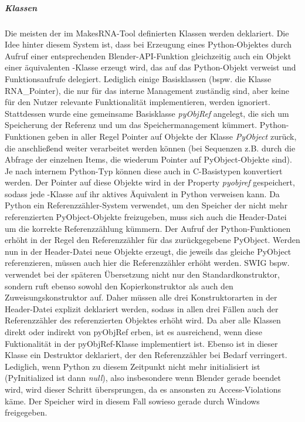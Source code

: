 \subparagraph{Klassen}

Die meisten der im MakesRNA-Tool definierten Klassen werden deklariert. Die Idee hinter diesem System ist, dass bei Erzeugung eines Python-Objektes durch Aufruf einer entsprechenden Blender-API-Funktion gleichzeitig auch ein Objekt einer äquivalenten \CC-Klasse erzeugt wird, das auf das Python-Objekt verweist und Funktionsaufrufe delegiert. Lediglich einige Basisklassen (bspw. die Klasse RNA\_Pointer), die nur für das interne Management zuständig sind, aber keine für den Nutzer relevante Funktionalität implementieren, werden ignoriert. Stattdessen wurde eine gemeinsame Basisklasse \emph{pyObjRef} angelegt, die sich um Speicherung der Referenz und um das Speichermanagement kümmert. Python-Funktionen geben in aller Regel Pointer auf Objekte der Klasse \emph{PyObject} zurück, die anschließend weiter verarbeitet werden können (bei Sequenzen z.B. durch die Abfrage der einzelnen Items, die wiederum Pointer auf PyObject-Objekte sind). Je nach internem Python-Typ können diese auch in C-Basistypen konvertiert werden. Der Pointer auf diese Objekte wird in der Property \emph{pyobjref} gespeichert, sodass jede \CC-Klasse auf ihr aktives Äquivalent in Python verweisen kann. Da Python ein Referenzzähler-System verwendet, um den Speicher der nicht mehr referenzierten PyObject-Objekte freizugeben, muss sich auch die Header-Datei um die korrekte Referenzzählung kümmern. Der Aufruf der Python-Funktionen erhöht in der Regel den Referenzzähler für das zurückgegebene PyObject. Werden nun in der Header-Datei neue Objekte erzeugt, die jeweils das gleiche PyObject referenzieren, müssen auch hier die Referenzzähler erhöht werden. SWIG bspw. verwendet bei der späteren Übersetzung nicht nur den Standardkonstruktor, sondern ruft ebenso sowohl den Kopierkonstruktor als auch den Zuweisungskonstruktor auf. Daher müssen alle drei Konstruktorarten in der Header-Datei explizit deklariert werden, sodass in allen drei Fällen auch der Referenzzähler des referenzierten Objektes erhöht wird. Da aber alle Klassen direkt oder indirekt von pyObjRef erben, ist es ausreichend, wenn diese Fuktionalität in der pyObjRef-Klasse implementiert ist. Ebenso ist in dieser Klasse ein Destruktor deklariert, der den Referenzzähler bei Bedarf verringert. Lediglich, wenn Python zu diesem Zeitpunkt nicht mehr initialisiert ist (PyInitialized ist dann \emph{null}), also insbesondere wenn Blender gerade beendet wird, wird dieser Schritt übersprungen, da es ansonsten zu Access-Violations käme. Der Speicher wird in diesem Fall sowieso gerade durch Windows freigegeben.

